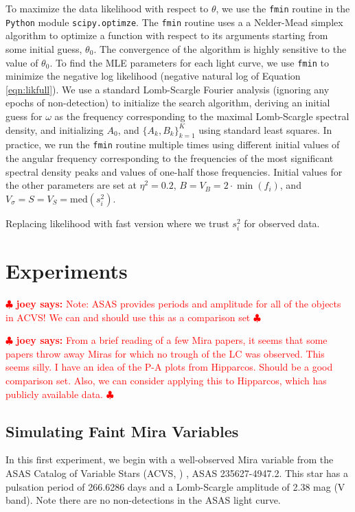 \documentclass[12pt,preprint]{aastex}
\newcommand{\fobs}{f_i}
\newcommand{\sobs}{s^2_i}
\newcommand{\joey}[1] { \textcolor{red} {
\ensuremath{\clubsuit} {\bf joey says:}  {#1}
\ensuremath{\clubsuit} } }%
\begin{document}
To maximize the data likelihood with respect to $\theta$, we use the {\tt fmin} routine in the {\tt Python} module {\tt scipy.optimze}.  The {\tt fmin} routine uses a a Nelder-Mead simplex algorithm to optimize a function with respect to its arguments starting from some initial guess, $\theta_0$.  The convergence of the algorithm is highly sensitive to the value of $\theta_0$.  To find the MLE parameters for each light curve, we use {\tt fmin} to minimize the negative log likelihood (negative natural log of Equation \ref{eqn:likfull}).  We use a standard Lomb-Scargle Fourier analysis (ignoring any epochs of non-detection) to initialize the search algorithm, deriving an initial guess for $\omega$ as the frequency corresponding to the maximal Lomb-Scargle spectral density, and initializing $A_0$, and $\{A_k, B_k\}_{k=1}^K$ using standard least squares.  In practice, we run the {\tt fmin} routine multiple times using different initial values of the angular frequency corresponding to the frequencies of the most significant spectral density peaks and values of one-half those frequencies.  Initial values for the other parameters are set at $\eta^2 = 0.2$, $B = V_B = 2\cdot\min(\fobs)$, and $ V_{\sigma} = S = V_S = \textrm{med}(\sobs)$.



Replacing likelihood with fast version where we trust $s_i^2$ for observed data.





\section{Experiments}
\label{sec:experiments}

\joey{Note: ASAS provides periods and amplitude for all of the objects in ACVS!  We can and should use this as a comparison set}

\joey{From a brief reading of a few Mira papers, it seems that some papers throw away Miras for which no trough of the LC was observed.  This seems silly.  I have an idea of the P-A plots from Hipparcos.  Should be a good comparison set.  Also, we can consider applying this to Hipparcos, which has publicly available data.}

\subsection{Simulating Faint Mira Variables}
\label{ss:mirasim}

In this first experiment, we begin with a well-observed Mira variable from the ASAS Catalog of Variable Stars (ACVS, \citealt{acvs}) , ASAS 235627-4947.2.  This star has a pulsation period of 266.6286 days and a Lomb-Scargle amplitude of 2.38 mag (V band).  Note there are no non-detections in the ASAS light curve.
\end{document}
